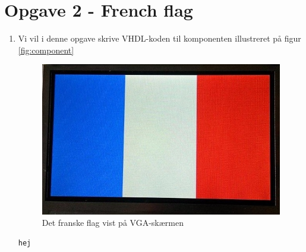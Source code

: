\section{Opgave 2 - French flag}

\begin{enumerate}[1)]
\item 

	
Vi vil i denne opgave skrive VHDL-koden til komponenten illustreret på figur \ref{fig:component}
	\begin{figure}[h]
		\centering
		\includegraphics[scale=0.4]{pictures/Oevelse8/opg2/franskFlag}
		\caption{Det franske flag vist på VGA-skærmen}
		\label{fig:frenchFlag}
	\end{figure}
	
		
	\begin{lstlisting}[caption={Kode for test af package},label={lst:opg1_2test}]
hej
	\end{lstlisting}
	
\end{enumerate}
	